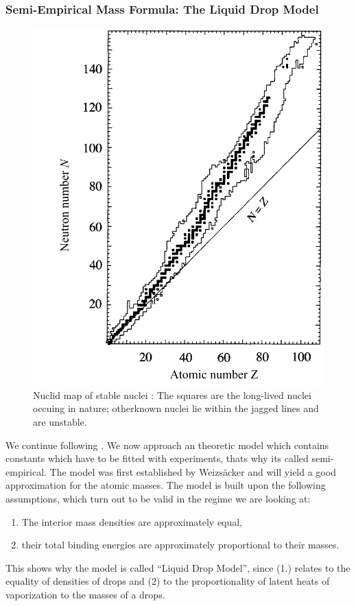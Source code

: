 \subsubsection{Semi-Empirical Mass Formula: The Liquid Drop Model}
\begin{figure}[htpb]
    \centering
    \includegraphics[width=0.6\linewidth]{figures/nuclidmap}
    \caption{Nuclid map of stable nuclei \cite{Hooshyar}: The squares are the long-lived nuclei
    occuing in nature; otherknown nuclei lie within the jagged lines and are unstable.}
    \label{fig:nuclidmap}
\end{figure}
\label{ssub:Semi-Empirical Mass Formula: The Liquid Drop Model}
We continue following \cite{Hooshyar}. We now approach an theoretic model which contains constants which
have to be fitted with experiments, thats why its called semi-empirical. 
The model was first established by Weizsäcker and will yield a 
good approximation for the atomic masses. The model is built upon the following assumptions, which turn
out to be valid in the regime we are looking at:
\begin{enumerate}
    \item The interior mass densities are approximately equal,
    \item their total binding energies are approximately proportional to their masses.
\end{enumerate}
This shows why the model is called ``Liquid Drop Model'', since (1.) relates to the equality of densities
of drops and (2) to the proportionality of latent heats of vaporization to the masses of a drops. 
\clearpage


